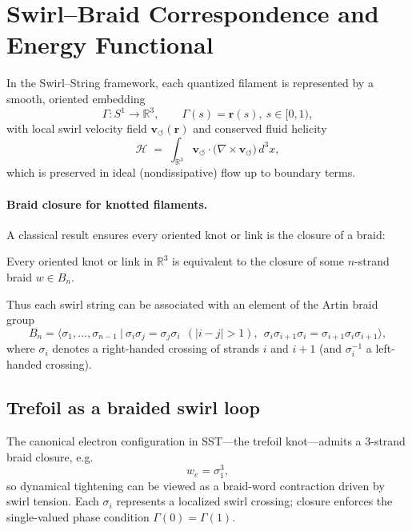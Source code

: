 \documentclass[10pt,reprint,aps,onecolumn,nofootinbib]{revtex4-2}
\begin{document}
\section{Swirl–Braid Correspondence and Energy Functional}\label{sec:swirlbraid}

    In the Swirl–String framework, each quantized filament is represented by a smooth, oriented embedding
    \[
        \Gamma: S^1 \to \mathbb{R}^3,\qquad \Gamma(s)=\mathbf{r}(s),\ s\in[0,1),
    \]
    with local swirl velocity field \(\mathbf{v}_{\!\boldsymbol{\circlearrowleft}}(\mathbf{r})\) and conserved fluid helicity
    \[
        \mathcal{H} \;=\; \int_{\mathbb{R}^3} \mathbf{v}_{\!\boldsymbol{\circlearrowleft}}\cdot
        \big(\nabla\times \mathbf{v}_{\!\boldsymbol{\circlearrowleft}}\big)\,d^3x,
    \]
    which is preserved in ideal (nondissipative) flow up to boundary terms.

    \paragraph*{Braid closure for knotted filaments.}
        A classical result ensures every oriented knot or link is the closure of a braid:

        \begin{theorem}
        Every oriented knot or link in \(\mathbb{R}^3\) is equivalent to the closure of some \(n\)-strand braid \(w\in B_n\).
        \end{theorem}

        Thus each swirl string can be associated with an element of the Artin braid group
        \[
            B_n = \big\langle \sigma_1,\dots,\sigma_{n-1}\ \big|\
            \sigma_i\sigma_j=\sigma_j\sigma_i\ \ (|i-j|>1),\ \
            \sigma_i\sigma_{i+1}\sigma_i=\sigma_{i+1}\sigma_i\sigma_{i+1}
            \big\rangle,
        \]
        where \(\sigma_i\) denotes a right-handed crossing of strands \(i\) and \(i{+}1\) (and \(\sigma_i^{-1}\) a left-handed crossing).

    \subsection*{Trefoil as a braided swirl loop}
        The canonical electron configuration in SST—the trefoil knot—admits a 3-strand braid closure, e.g.
        \[
            w_e = \sigma_1^3,
        \]
        so dynamical tightening can be viewed as a braid-word contraction driven by swirl tension. Each \(\sigma_i\) represents a localized swirl crossing; closure enforces the single-valued phase condition \(\Gamma(0)=\Gamma(1)\).
\end{document}
